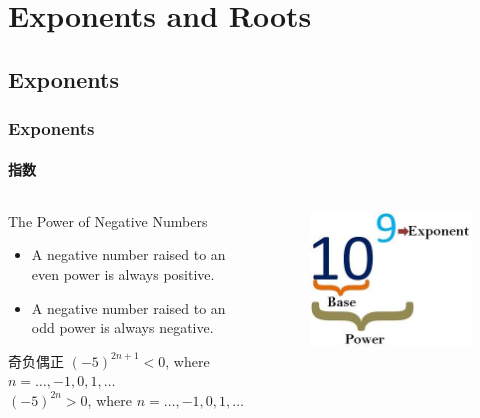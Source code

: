 \documentclass[
	11pt, %
]{beamer}
\begin{document}
\section{Exponents and Roots}
\subsection{Exponents}

\begin{frame}
\frametitle{Exponents}
\framesubtitle{指数}

	\begin{columns}[c] %
		\begin{column}{0.45\textwidth} %
				\begin{alertblock}{The Power of Negative Numbers}
						\begin{itemize}
							\item A negative number raised to an even power is always positive.
							\item A negative number raised to an odd power is always negative. 
					\end{itemize}
			 \end{alertblock}
	\begin{exampleblock}{奇负偶正}
		$(-5)^{2n + 1} <0 $, where $n =\ldots, -1, 0 , 1, \ldots$ \\
		$(-5)^{2n } > 0 $, where $n =\ldots, -1, 0 , 1, \ldots$ \\
	\end{exampleblock}

		\end{column}
		\begin{column}{0.5\textwidth} %
		\begin{figure}
		\includegraphics[width=0.5\linewidth]{exponent-vs-power.jpeg}
	\end{figure}
		\end{column}
	\end{columns}
	
\end{frame}
\end{document}
